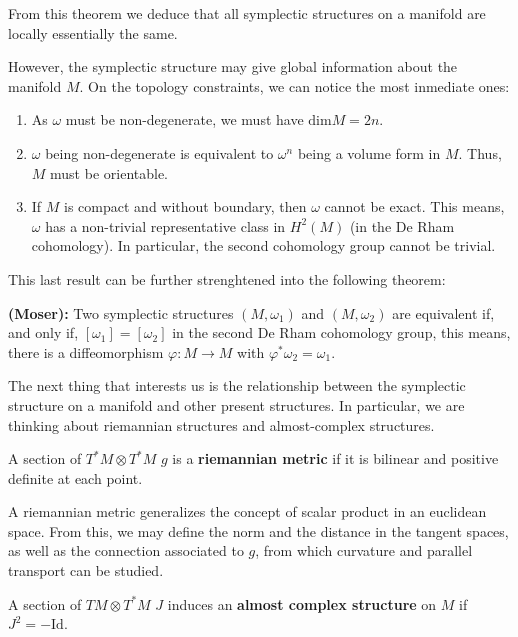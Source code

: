 From this theorem we deduce that all symplectic structures on a manifold are locally essentially the same.

However, the symplectic structure may give global information about the manifold $M$. On the topology constraints, we can notice the most inmediate ones:

\begin{enumerate}
	\item As $\omega$ must be non-degenerate, we must have $\text{dim}M = 2n$.
	\item $\omega$ being non-degenerate is equivalent to $\omega^n$ being a volume form in $M$. Thus, $M$ must be orientable.
	\item If $M$ is compact and without boundary, then $\omega$ cannot be exact. This means, $\omega$ has a non-trivial representative class in $H^2(M)$ (in the De Rham cohomology). In particular, the second cohomology group cannot be trivial.
\end{enumerate}

This last result can be further strenghtened into the following theorem:

\begin{theo}
{\bf (Moser):} Two symplectic structures $(M,\omega_1)$ and $(M,\omega_2)$ are equivalent if, and only if, $[\omega_1] = [\omega_2]$ in the second De Rham cohomology group, this means, there is a diffeomorphism $\varphi : M \rightarrow M$ with $\varphi^{\ast}\omega_2 = \omega_1$.
\end{theo}

The next thing that interests us is the relationship between the symplectic structure on a manifold and other present structures. In particular, we are thinking about riemannian structures and almost-complex structures.

\begin{deff}
A section of $T^{\ast}M \otimes T^{\ast}M$ $g$ is a {\bf riemannian metric} if it is bilinear and positive definite at each point.
\end{deff}

A riemannian metric generalizes the concept of scalar product in an euclidean space. From this, we may define the norm and the distance in the tangent spaces, as well as the connection associated to $g$, from which curvature and parallel transport can be studied.

\begin{deff}
A section of $TM \otimes T^{\ast}M$ $J$ induces an {\bf almost complex structure} on $M$ if $J^2 = - \text{Id}$.
\end{deff}

